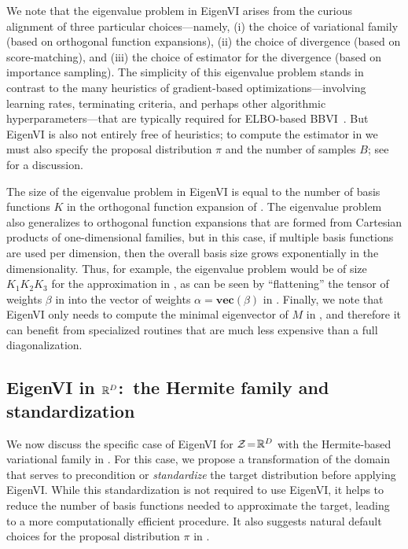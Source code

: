We note that the eigenvalue problem in EigenVI arises from the curious alignment of three particular choices---namely, (i) the choice of variational family
(based on orthogonal function expansions), (ii) the choice of
divergence (based on score-matching), {and (iii) the choice of estimator for the divergence
(based on importance sampling)}.
The simplicity of this eigenvalue problem stands
in contrast to the many heuristics of gradient-based optimizations---involving learning
rates, terminating criteria, and perhaps other algorithmic
hyperparameters---that are typically required for ELBO-based
BBVI~\citep{dhaka2020robust,dhaka2021challenges}.
But EigenVI is also not entirely free of heuristics; to compute the estimator in
 we must also specify the proposal distribution $\pi$ and the number
of samples $B$; see  for a discussion.

The size of the eigenvalue problem in EigenVI is equal to the
number of basis functions $K$ in the orthogonal function expansion of . The
eigenvalue problem also generalizes to orthogonal function expansions
that are formed from Cartesian products of one-dimensional families,
but in this case, if multiple basis functions are used per dimension,
then the overall basis size grows exponentially in the dimensionality.
Thus, for example, the eigenvalue problem would be of size
$K_1 K_2 K_3$ for the approximation in , as can be
seen by ``flattening'' the tensor of weights $\beta$ in 
into the vector of weights $\alpha=\textbf{vec}(\beta)$ in .
Finally, we note that EigenVI only needs to compute the minimal eigenvector of $M$ in , and therefore it can benefit from specialized routines that are much less expensive than a full diagonalization.




\subsection{EigenVI in $\mathbb{R}^D$:\ the Hermite family and standardization}
\label{sec:precon}

We now discuss the specific case of EigenVI for $\mathcal{Z}\!=\!\mathbb{R}^D$ with the Hermite-based variational family in .
For this case, we propose a transformation of the domain that serves to precondition or \textit{standardize}
the target distribution before applying EigenVI.
While this standardization is not required to use EigenVI,
it  helps to reduce the number of basis functions needed to approximate the target,
leading to a more computationally efficient procedure.
It also suggests natural default choices for the
proposal distribution $\pi$ in .

